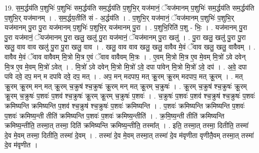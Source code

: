 \documentclass[17pt]{extarticle}
\begin{document}
19. स॒म॒र्द्धय॑ति प॒शुभिः॑ प॒शुभिः॑ सम॒र्द्धय॑ति सम॒र्द्धय॑ति प॒शुभि॒र् यज॑मानं॒ ॅयज॑मानम् प॒शुभिः॑ सम॒र्द्धय॑ति सम॒र्द्धय॑ति प॒शुभि॒र् यज॑मानम् । . स॒म॒र्द्धय॒तीति॑ सं - अ॒र्द्धय॑ति । . प॒शुभि॒र् यज॑मानं॒ ॅयज॑मानम् प॒शुभिः॑ प॒शुभि॒र् यज॑मानम् पु॒रा पु॒रा यज॑मानम् प॒शुभिः॑ प॒शुभि॒र् यज॑मानम् पु॒रा । . प॒शुभि॒रिति॑ प॒शु - भिः॒ । . यज॑मानम् पु॒रा पु॒रा यज॑मानं॒ ॅयज॑मानम् पु॒रा खलु॒ खलु॑ पु॒रा यज॑मानं॒ ॅयज॑मानम् पु॒रा खलु॑ । . पु॒रा खलु॒ खलु॑ पु॒रा पु॒रा खलु॒ वाव वाव खलु॑ पु॒रा पु॒रा खलु॒ वाव । . खलु॒ वाव वाव खलु॒ खलु॒ वावैव मे॒वं ॅवाव खलु॒ खलु॒ वावैवम् । . वावैव मे॒वं ॅवाव वावैवम् मि॒त्रो मि॒त्र ए॒वं ॅवाव वावैवम् मि॒त्रः । . ए॒वम् मि॒त्रो मि॒त्र ए॒व मे॒वम् मि॒त्रो॑ ऽवे दवेन् मि॒त्र ए॒व मे॒वम् मि॒त्रो॑ ऽवेत् । . मि॒त्रो॑ ऽवे दवेन् मि॒त्रो मि॒त्रो॑ ऽवे॒ दपा पा॑वेन् मि॒त्रो मि॒त्रो॑ ऽवे॒ दप॑ । . अ॒वे॒ दपा पा॑वे दवे॒ दप॒ मन् म दपा॑वे दवे॒ दप॒ मत् । . अप॒ मन् मदपाप॒ मत् क्रू॒रम् क्रू॒रम् मदपाप॒ मत् क्रू॒रम् । . मत् क्रू॒रम् क्रू॒रम् मन् मत् क्रू॒रम् च॒क्रुष॑ श्च॒क्रुषः॑ क्रू॒रम् मन् मत् क्रू॒रम् च॒क्रुषः॑ । . क्रू॒रम् च॒क्रुष॑ श्च॒क्रुषः॑ क्रू॒रम् क्रू॒रम् च॒क्रुषः॑ प॒शवः॑ प॒शव॑ श्च॒क्रुषः॑ क्रू॒रम् क्रू॒रम् च॒क्रुषः॑ प॒शवः॑ । . च॒क्रुषः॑ प॒शवः॑ प॒शव॑ श्च॒क्रुष॑ श्च॒क्रुषः॑ प॒शवः॑ क्रमिष्यन्ति क्रमिष्यन्ति प॒शव॑ श्च॒क्रुष॑ श्च॒क्रुषः॑ प॒शवः॑ क्रमिष्यन्ति । . प॒शवः॑ क्रमिष्यन्ति क्रमिष्यन्ति प॒शवः॑ प॒शवः॑ क्रमिष्य॒न्ती तीति॑ क्रमिष्यन्ति प॒शवः॑ प॒शवः॑ क्रमिष्य॒न्तीति॑ । . क्र॒मि॒ष्य॒न्ती तीति॑ क्रमिष्यन्ति क्रमिष्य॒न्तीति॒ तस्मा॒त् तस्मा॒ दिति॑ क्रमिष्यन्ति क्रमिष्य॒न्तीति॒ तस्मा᳚त् । . इति॒ तस्मा॒त् तस्मा॒ दितीति॒ तस्मा॑ दे॒व मे॒वम् तस्मा॒ दितीति॒ तस्मा॑ दे॒वम् । . तस्मा॑ दे॒व मे॒वम् तस्मा॒त् तस्मा॑ दे॒व म॑वृणीता वृणीतै॒वम् तस्मा॒त् तस्मा॑ दे॒व म॑वृणीत । \newline
\end{document}
